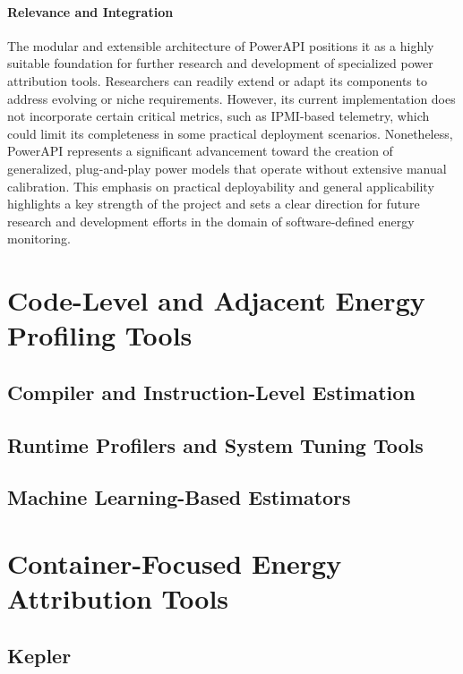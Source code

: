 \paragraph{Relevance and Integration}
The modular and extensible architecture of PowerAPI positions it as a highly suitable foundation for further research and development of specialized power attribution tools. Researchers can readily extend or adapt its components to address evolving or niche requirements. However, its current implementation does not incorporate certain critical metrics, such as IPMI-based telemetry, which could limit its completeness in some practical deployment scenarios. Nonetheless, PowerAPI represents a significant advancement toward the creation of generalized, plug-and-play power models that operate without extensive manual calibration. This emphasis on practical deployability and general applicability highlights a key strength of the project and sets a clear direction for future research and development efforts in the domain of software-defined energy monitoring.





\section{Code-Level and Adjacent Energy Profiling Tools}
\label{sec:code-tools}
\subsection{Compiler and Instruction-Level Estimation}
\label{sec:compiler-tools}
\subsection{Runtime Profilers and System Tuning Tools}
\label{sec:runtime-tools}
\subsection{Machine Learning-Based Estimators}
\label{sec:ml-estimators}

\section{Container-Focused Energy Attribution Tools}
\label{sec:container-tools}

\subsection{Kepler}
\label{sec:kepler}
